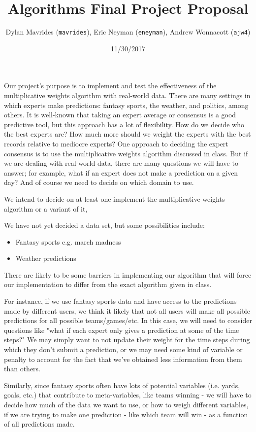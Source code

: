 \documentclass{pset}
\title{Algorithms Final Project Proposal}
\author{
    Dylan  Mavrides  (\texttt{mavrides}),
    Eric   Neyman    (\texttt{eneyman}),
    Andrew Wonnacott (\texttt{ajw4})
    }
\date{11/30/2017}
\begin{document}
\maketitle

Our project's purpose is to implement and test the effectiveness of the multiplicative weights algorithm with real-world data. There are many settings in which experts make predictions: fantasy sports, the weather, and politics, among others. It is well-known that taking an expert average or consensus is a good predictive tool, but this approach has a lot of flexibility. How do we decide who the best experts are? How much more should we weight the experts with the best records relative to mediocre experts? One approach to deciding the expert consensus is to use the multiplicative weights algorithm discussed in class. But if we are dealing with real-world data, there are many questions we will have to answer; for example, what if an expert does not make a prediction on a given day? And of course we need to decide on which domain to use.

We intend to decide on at least one implement the multiplicative weights algorithm or a variant of it, 

We have not yet decided a data set, but some possibilities include:
\begin{itemize}
\item Fantasy sports e.g. march madness
\item Weather predictions
\end{itemize}

There are likely to be some barriers in implementing our algorithm that will force our implementation to differ from the exact algorithm given in class. 

For instance, if we use fantasy sports data and have access to the predictions made by different users, we think it likely that not all users will make all possible predictions for all possible teams/games/etc. In this case, we will need to consider questions like "what if each expert only gives a prediction at some of the time steps?" We may simply want to not update their weight for the time steps during which they don't submit a prediction, or we may need some kind of variable or penalty to account for the fact that we've obtained less information from them than others.

Similarly, since fantasy sports often have lots of potential variables (i.e. yards, goals, etc.) that contribute to meta-variables, like teams winning - we will have to decide how much of the data we want to use, or how to weigh different variables, if we are trying to make one prediction - like which team will win - as a function of all predictions made.
\end{document}
